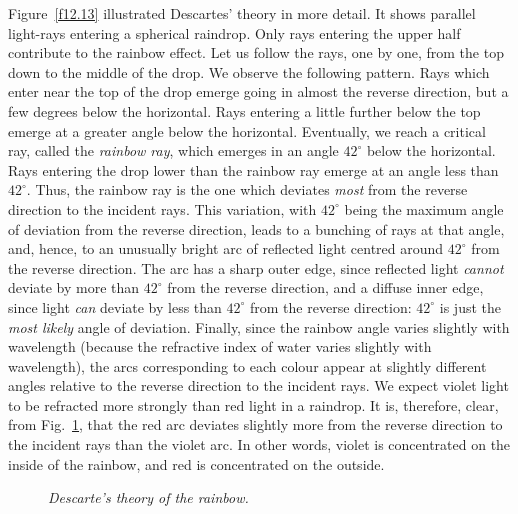 Figure~\ref{f12.13} illustrated Descartes' theory in more detail.
It shows parallel light-rays
 entering a spherical raindrop. Only
rays entering the upper half contribute to the rainbow effect. Let us
follow the rays, one by one, from the top down to the middle
of the drop. We observe the following pattern. Rays which enter near the
top of the drop emerge going in almost the reverse direction,
but  a few
degrees below the horizontal. Rays entering a little
further below the top emerge at a greater angle below the horizontal. 
Eventually, we reach a critical ray, called the {\em rainbow ray}, which
emerges in an angle $42^\circ$ below the horizontal. Rays
entering the drop lower than the rainbow ray emerge at an angle
 less than $42^\circ$. Thus, the rainbow ray is the
one  which 
 deviates
{\em most}\/ from the reverse direction to the incident rays.
This variation, with $42^\circ$ being the maximum angle of deviation
from the  reverse direction,
leads to a bunching of rays at that angle, and, hence, to  an 
unusually bright 
arc  of reflected light centred around 
 $42^\circ$ from the reverse direction. The arc has a sharp outer edge,
since reflected light {\em cannot}\/ deviate by more than $42^\circ$ from the reverse direction,
 and a diffuse inner edge, since light {\em can}\/
deviate by less than $42^\circ$ from the reverse direction:
 $42^\circ$ is
just the {\em most likely} angle of deviation. Finally, since the
rainbow angle varies slightly with wavelength  (because
the refractive index of water varies slightly with wavelength), the
arcs corresponding to
each colour appear at slightly different angles relative to
the reverse direction to  the incident  rays. We
expect violet light to be refracted more strongly than red light
in a raindrop. It is, therefore, clear, from Fig.~\ref{f12.14},
that the red arc deviates slightly more from the  reverse direction
to  the incident rays than
the violet arc. In other words, violet is concentrated on the inside
of the rainbow, and red is concentrated on the outside. 

\begin{figure}
\epsfysize=3.5in
\centerline{}
\caption{\em Descarte's theory of the rainbow.}\label{f12.14}
\end{figure}


